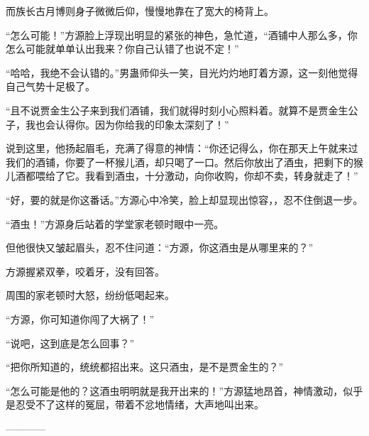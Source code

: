 \begin{this_body}
而族长古月博则身子微微后仰，慢慢地靠在了宽大的椅背上。

“怎么可能！”方源脸上浮现出明显的紧张的神色，急忙道，“酒铺中人那么多，你怎么可能就单单认出我来？你自己认错了也说不定！”

“哈哈，我绝不会认错的。”男蛊师仰头一笑，目光灼灼地盯着方源，这一刻他觉得自己气势十足极了。

“且不说贾金生公子来到我们酒铺，我们就得时刻小心照料着。就算不是贾金生公子，我也会认得你。因为你给我的印象太深刻了！”

说到这里，他扬起眉毛，充满了得意的神情：“你还记得么，你在那天上午就来过我们的酒铺，你要了一杯猴儿酒，却只喝了一口。然后你放出了酒虫，把剩下的猴儿酒都喂给了它。我看到酒虫，十分激动，向你收购，你却不卖，转身就走了！”

“好，要的就是你这番话。”方源心中冷笑，脸上却显现出惊容，，忍不住倒退一步。

“酒虫！”方源身后站着的学堂家老顿时眼中一亮。

但他很快又皱起眉头，忍不住问道：“方源，你这酒虫是从哪里来的？”

方源握紧双拳，咬着牙，没有回答。

周围的家老顿时大怒，纷纷低喝起来。

“方源，你可知道你闯了大祸了！”

“说吧，这到底是怎么回事？”

“把你所知道的，统统都招出来。这只酒虫，是不是贾金生的？”

“怎么可能是他的？这酒虫明明就是我开出来的！”方源猛地昂首，神情激动，似乎是忍受不了这样的冤屈，带着不忿地情绪，大声地叫出来。

------------

\end{this_body}

